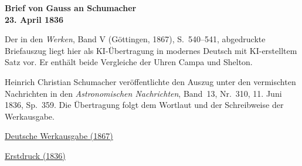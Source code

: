 \clearpage
\thispagestyle{empty}
\begin{center}\Large\textbf{Brief von Gauss an Schumacher\\23. April 1836}\end{center}

Der in den \textit{Werken}, Band V (Göttingen, 1867), S.~540--541, abgedruckte Briefauszug liegt hier als KI-Übertragung in modernes Deutsch mit KI-erstelltem Satz vor. Er enthält beide Vergleiche der Uhren Campa und Shelton.

Heinrich Christian Schumacher veröffentlichte den Auszug unter den vermischten Nachrichten in den \textit{Astronomischen Nachrichten}, Band~13, Nr.~310, 11. Juni 1836, Sp.~359. Die Übertragung folgt dem Wortlaut und der Schreibweise der Werkausgabe.

\medskip\noindent
\href{https://gdz.sub.uni-goettingen.de/id/PPN236006339}{Deutsche Werkausgabe (1867)}\par
\noindent\href{https://www.digitale-sammlungen.de/view/bsb10049438?page=188}{Erstdruck (1836)}
\clearpage

